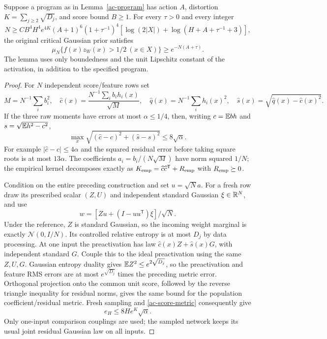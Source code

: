 \begin{lemma}\label{ac-channel}
Suppose a program as in Lemma~\ref{ac-program} has action $A$,
distortion $K=\sum_{j\ge2}\sqrt{D_j}$, and score bound $B\ge1$.
For every $\tau>0$ and every integer
\begin{equation}\label{ac-channel-width}
 N\ge CB^4H^4e^{4K}(A+1)^6(1+\tau^{-1})^4
       [\log(2|X|)+\log(H+A+\tau^{-1}+3)],
\end{equation}
the original critical Gaussian prior satisfies
\[
 \mu_N\{f(x)z_W(x)>1/2\ (x\in X)\}\ge e^{-N(A+\tau)}.
\]
The lemma uses only boundedness and the unit Lipschitz constant of the
activation, in addition to the specified program.
\end{lemma}
\begin{proof}
For $N$ independent score/feature rows set
\[
 M=N^{-1}\sum_i b_i^2,\quad
 \widehat c(x)=\frac{N^{-1}\sum_i b_ih_i(x)}{\sqrt M},\quad
 \widehat q(x)=N^{-1}\sum_i h_i(x)^2,\quad
 \widehat s(x)=\sqrt{\widehat q(x)-\widehat c(x)^2}.
\]
If the three raw moments have errors at most $\alpha\le1/4$,
then, writing $c=\mathbb E bh$ and $s=\sqrt{\mathbb E h^2-c^2}$,
\begin{equation}\label{ac-score-metric}
 \max_x\sqrt{(\widehat c-c)^2+(\widehat s-s)^2}
                         \le8\sqrt\alpha.
\end{equation}
For example $|\widehat c-c|\le4\alpha$ and the squared residual
error before taking square roots is at most $13\alpha$.
The coefficients $a_i=b_i/(N\sqrt M)$ have norm squared $1/N$;
the empirical kernel decomposes exactly as
$K_{\rm emp}=\widehat c\widehat c^{\mathsf T}+R_{\rm emp}$ with
$R_{\rm emp}\succeq0$.

Condition on the entire preceding construction and set $u=\sqrt N a$.
For a fresh row draw its prescribed scalar $(Z,U)$ and independent
standard Gaussian $\xi\in\mathbb R^N$, and use
\begin{equation}\label{ac-row-realization}
 w=[Zu+(I-uu^{\mathsf T})\xi]/\sqrt N.
\end{equation}
Under the reference, $Z$ is standard Gaussian, so the incoming
weight marginal is exactly $\mathcal N(0,I/N)$. Its controlled
relative entropy is at most $D_j$ by data processing. At one input
the preactivation has law $\widehat c(x)Z+\widehat s(x)G$,
with independent standard $G$. Couple this to the ideal preactivation
using the same $Z,U,G$. Gaussian entropy duality gives
$\mathbb E Z^2\le e^{2\sqrt{D_j}}$, so the preactivation and feature RMS
errors are at most $e^{\sqrt{D_j}}$ times the preceding metric error.
Orthogonal projection onto the common unit score, followed by the
reverse triangle inequality for residual norms, gives the same bound
for the population coefficient/residual metric. Fresh sampling and
\eqref{ac-score-metric} consequently give
\begin{equation}\label{ac-metric-recursion}
 e_H\le8He^K\sqrt\alpha.
\end{equation}
Only one-input comparison couplings are used; the sampled network
keeps its usual joint residual Gaussian law on all inputs.


\end{proof}

